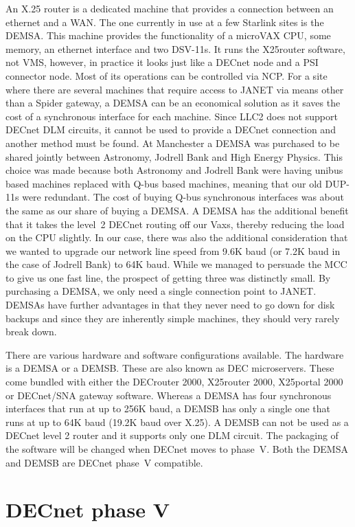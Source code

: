An X.25 router is a dedicated machine that provides a connection between an
ethernet and a WAN. The one currently in use at a few Starlink sites is the
DEMSA. This machine provides the functionality of a microVAX CPU, some memory,
an ethernet interface and two DSV-11s. It runs the X25router software, not VMS,
however, in practice it looks just like a DECnet node and a PSI connector node.
Most of its operations can be controlled via NCP. For a site where there are
several machines that require access to JANET via means other than a Spider
gateway, a DEMSA can be an economical solution as it saves the cost of a
synchronous interface for each machine. Since LLC2 does not support DECnet DLM
circuits, it cannot be used to provide a DECnet connection and another  method
must be found. At Manchester a DEMSA was purchased to be shared jointly between
Astronomy, Jodrell Bank and High Energy Physics. This choice was made because
both Astronomy and Jodrell Bank were having unibus based machines replaced with
Q-bus based machines, meaning that our old DUP-11s were redundant. The cost of
buying Q-bus synchronous interfaces was about the same as our share of buying a
DEMSA. A DEMSA has the additional benefit that it takes the level~2  DECnet
routing off our Vaxs, thereby reducing the load on the CPU slightly. In our
case, there was also the additional consideration that we wanted to upgrade our
network line speed from 9.6K baud (or 7.2K baud in the case of Jodrell Bank) to
64K baud. While we managed to persuade the MCC to give us one fast line, the
prospect of getting three was distinctly small. By purchasing a DEMSA, we only
need a single connection point to JANET. DEMSAs have further advantages in that
they never need to go down for disk backups and since they are inherently
simple machines, they should very rarely break down. 

There are various hardware and software configurations available. The hardware
is a DEMSA or a DEMSB. These are also known as DEC microservers. These come
bundled with either the DECrouter 2000, X25router 2000, X25portal 2000 or
DECnet/SNA gateway software. Whereas a DEMSA has four synchronous interfaces
that run at up to 256K baud, a DEMSB has only a single one that runs at up to
64K baud (19.2K baud over X.25). A DEMSB can not be used as a DECnet level 2
router and it supports only one DLM circuit. The packaging of the software
will be changed when DECnet moves to phase~V. Both the DEMSA and DEMSB are
DECnet phase~V compatible.

\section{DECnet phase V}

